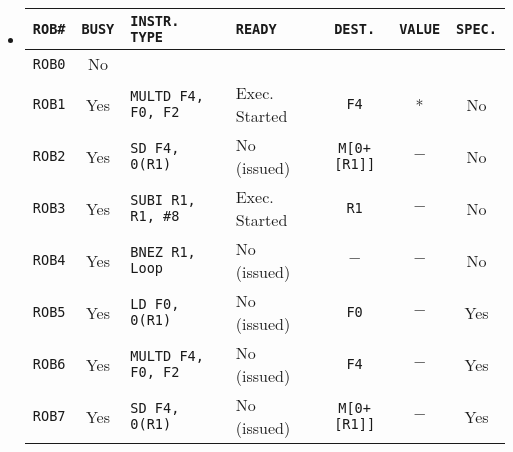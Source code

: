\begin{examplebox}
\begin{itemize}
        \item {}
        \begin{center}
            \begin{adjustbox}{width={.92\textwidth},totalheight={\textheight},keepaspectratio}
                \begin{tabular}{@{} c | c | l | l | c | c | c @{}}
                    \toprule
                    \texttt{ROB\#}      & \texttt{BUSY}     & \texttt{INSTR. TYPE}      & \texttt{READY}        & \texttt{DEST.}        & \texttt{VALUE}        & \texttt{SPEC.}    \\
                    \midrule
                    \texttt{ROB0}       & No                &                           &                       &                       &                       &                   \\ [.3em]
                    \texttt{ROB1}       & Yes               & \texttt{MULTD F4, F0, F2} & Exec. Started         & \texttt{F4}           & *                     & No                \\ [.3em]
                    \texttt{ROB2}       & Yes               & \texttt{SD F4, 0(R1)}     & No (issued)           & \texttt{M[0+[R1]]}    & $-$                   & No                \\ [.3em]
                    \texttt{ROB3}       & Yes               & \texttt{SUBI R1, R1, \#8} & Exec. Started         & \texttt{R1}           & $-$                   & No                \\ [.3em]
                    \texttt{ROB4}       & Yes               & \texttt{BNEZ R1, Loop}    & No (issued)           & $-$                   & $-$                   & No                \\ [.3em]
                    \texttt{ROB5}       & Yes               & \texttt{LD F0, 0(R1)}     & No (issued)           & \texttt{F0}           & $-$                   & Yes               \\ [.3em]
                    \texttt{ROB6}       & Yes               & \texttt{MULTD F4, F0, F2} & No (issued)           & \texttt{F4}           & $-$                   & Yes               \\ [.3em]
                    \texttt{ROB7}       & Yes               & \texttt{SD F4, 0(R1)}     & No (issued)           & \texttt{M[0+[R1]]}    & $-$                   & Yes               \\
                    \bottomrule
                \end{tabular}

\end{adjustbox}
\end{center}
\end{itemize}
\end{examplebox}
